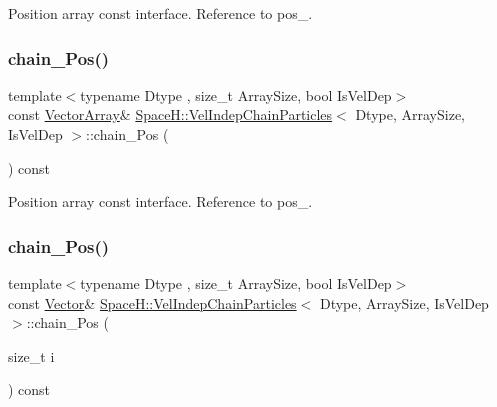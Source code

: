 Position array const interface. Reference to pos\+\_\+. 

\mbox{\label{class_space_h_1_1_vel_indep_chain_particles_a2dd7d2f703141d0ef3d8728b2a57cb83}} 
\subsubsection{\texorpdfstring{chain_\+Pos()}{chainPos()}\hspace{0.1cm}{\footnotesize\ttfamily [2/4]}}
{\footnotesize\ttfamily template$<$typename Dtype , size\+\_\+t Array\+Size, bool Is\+Vel\+Dep$>$ \\
const \mbox{\hyperlink{class_space_h_1_1_vel_indep_particles_aa9983058940249df8b00fa800e8cbad2}{Vector\+Array}}\& \mbox{\hyperlink{class_space_h_1_1_vel_indep_chain_particles}{Space\+H\+::\+Vel\+Indep\+Chain\+Particles}}$<$ Dtype, Array\+Size, Is\+Vel\+Dep $>$\+::chain_\+Pos (\begin{DoxyParamCaption}{ }\end{DoxyParamCaption}) const\hspace{0.3cm}{\ttfamily [inline]}}



Position array const interface. Reference to pos\+\_\+. 

\mbox{\label{class_space_h_1_1_vel_indep_chain_particles_a1d1f6b6ed5e916f84e6502d98773ed13}} 
\subsubsection{\texorpdfstring{chain_\+Pos()}{chainPos()}\hspace{0.1cm}{\footnotesize\ttfamily [3/4]}}
{\footnotesize\ttfamily template$<$typename Dtype , size\+\_\+t Array\+Size, bool Is\+Vel\+Dep$>$ \\
const \mbox{\hyperlink{class_space_h_1_1_vel_indep_particles_a61bbcfdb0dc7f99f3c68af69a755c935}{Vector}}\& \mbox{\hyperlink{class_space_h_1_1_vel_indep_chain_particles}{Space\+H\+::\+Vel\+Indep\+Chain\+Particles}}$<$ Dtype, Array\+Size, Is\+Vel\+Dep $>$\+::chain_\+Pos (\begin{DoxyParamCaption}\item[{size\+\_\+t}]{i }\end{DoxyParamCaption}) const\hspace{0.3cm}{\ttfamily [inline]}}




